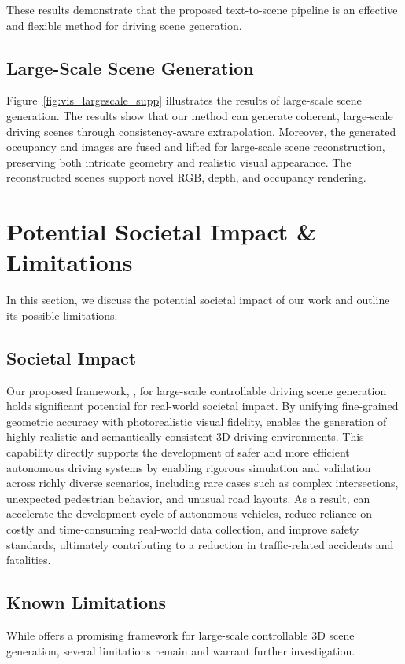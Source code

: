 These results demonstrate that the proposed text-to-scene pipeline is an effective and flexible method for driving scene generation.

\subsection{Large-Scale Scene Generation}
Figure~\ref{fig:vis_largescale_supp} illustrates the results of large-scale scene generation. The results show that our method can generate coherent, large-scale driving scenes through consistency-aware extrapolation. Moreover, the generated occupancy and images are fused and lifted for large-scale scene reconstruction, preserving both intricate geometry and realistic visual appearance. The reconstructed scenes support novel RGB, depth, and occupancy rendering.

\section{Potential Societal Impact \& Limitations}
In this section, we discuss the potential societal impact of our work and outline its possible limitations.

\subsection{Societal Impact}
Our proposed framework, {\ours}, for large-scale controllable driving scene generation holds significant potential for real-world societal impact. By unifying fine-grained geometric accuracy with photorealistic visual fidelity, {\method} enables the generation of highly realistic and semantically consistent 3D driving environments. This capability directly supports the development of safer and more efficient autonomous driving systems by enabling rigorous simulation and validation across richly diverse scenarios, including rare cases such as complex intersections, unexpected pedestrian behavior, and unusual road layouts. As a result, {\method} can accelerate the development cycle of autonomous vehicles, reduce reliance on costly and time-consuming real-world data collection, and improve safety standards, ultimately contributing to a reduction in traffic-related accidents and fatalities.

\subsection{Known Limitations}
While {\ours} offers a promising framework for large-scale controllable 3D scene generation, several limitations remain and warrant further investigation.

